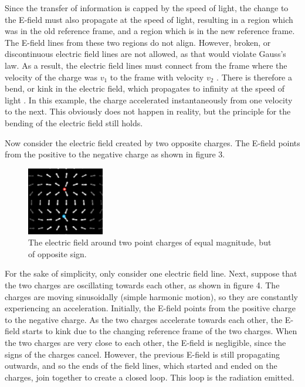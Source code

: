 \documentclass[12pt]{article}
\begin{document}
Since the transfer of information is capped by the speed of light, the change to the E-field must also propagate at the speed of light, resulting in a region which was in the old reference frame, and a region which is in the new reference frame. The E-field lines from these two regions do not align. However, broken, or discontinuous electric field lines are not allowed, as that would violate Gauss's law. As a result, the electric field lines must connect from the frame where the velocity of the charge was $v_1$ to the frame with velocity $v_2$ \cite{schroeder}. There is therefore a bend, or kink in the electric field, which propagates to infinity at the speed of light \cite{schroeder}. In this example, the charge accelerated instantaneously from one velocity to the next. This obviously does not happen in reality, but the principle for the bending of the electric field still holds.

Now consider the electric field created by two opposite charges. The E-field points from the positive to the negative charge as shown in figure 3. 
\newpage
\begin{figure}[h]
    \centering
    \includegraphics[width=0.3\textwidth]{positive-negative-EField.png}
    \caption{The electric field around two point charges of equal magnitude, but of opposite sign.}
\end{figure} 

For the sake of simplicity, only consider one electric field line. Next, suppose that the two charges are oscillating towards each other, as shown in figure 4. The charges are moving sinusoidally (simple harmonic motion), so they are constantly experiencing an acceleration. Initially, the E-field points from the positive charge to the negative charge. As the two charges accelerate towards each other, the E-field starts to kink due to the changing reference frame of the two charges. When the two charges are very close to each other, the E-field is negligible, since the signs of the charges cancel. However, the previous E-field is still propagating outwards, and so the ends of the field lines, which started and ended on the charges, join together to create a closed loop. This loop is the radiation emitted.
\end{document}
